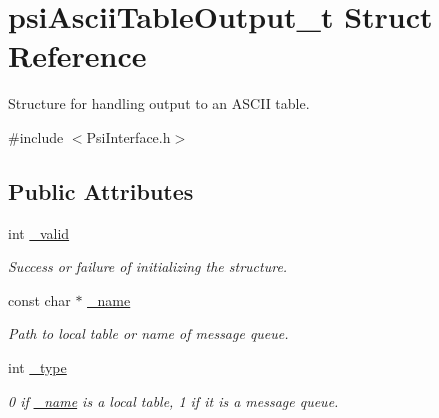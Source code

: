 \hypertarget{structpsiAsciiTableOutput__t}{}\section{psi\+Ascii\+Table\+Output\+\_\+t Struct Reference}
\label{structpsiAsciiTableOutput__t}


Structure for handling output to an A\+S\+C\+II table.  




{\ttfamily \#include $<$Psi\+Interface.\+h$>$}

\subsection*{Public Attributes}
\begin{DoxyCompactItemize}
\item 
\mbox{\label{structpsiAsciiTableOutput__t_a787f59c8e7319c437d7458d6470654c6}} 
int \hyperlink{structpsiAsciiTableOutput__t_a787f59c8e7319c437d7458d6470654c6}{\+\_\+valid}
\begin{DoxyCompactList}\small\item\em Success or failure of initializing the structure. \end{DoxyCompactList}\item 
\mbox{\label{structpsiAsciiTableOutput__t_aaccb8efb45387db8b563062beca99825}} 
const char $\ast$ \hyperlink{structpsiAsciiTableOutput__t_aaccb8efb45387db8b563062beca99825}{\+\_\+name}
\begin{DoxyCompactList}\small\item\em Path to local table or name of message queue. \end{DoxyCompactList}\item 
\mbox{\label{structpsiAsciiTableOutput__t_a2faf1afb6a1d4410a902d2c2074a8ea9}} 
int \hyperlink{structpsiAsciiTableOutput__t_a2faf1afb6a1d4410a902d2c2074a8ea9}{\+\_\+type}
\begin{DoxyCompactList}\small\item\em 0 if \hyperlink{structpsiAsciiTableOutput__t_aaccb8efb45387db8b563062beca99825}{\+\_\+name} is a local table, 1 if it is a message queue. \end{DoxyCompactList}\item 

\end{DoxyCompactItemize}
